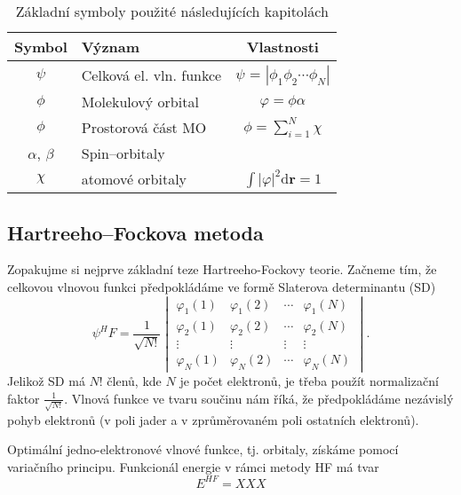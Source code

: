 \begin{table}[ht]
\centering
\caption{Základní symboly použité následujících kapitolách}
\begin{tabular}{|c|l|c|}
\hline 
\rule[-1ex]{0pt}{2.5ex} Symbol & 	Význam	& Vlastnosti \\ 
\hline 
\rule[-1ex]{0pt}{2.5ex} $\psi$ & Celková el. vln. funkce  & $\psi$ = $|\phi_1 \phi_2 \cdots \phi_N |$ \\ 
\hline 
\rule[-1ex]{0pt}{2.5ex} $\phi$ & Molekulový orbital & $\varphi=\phi \alpha $\\ 
\hline 
\rule[-1ex]{0pt}{2.5ex} $\phi$ & Prostorová část MO & $\phi=\sum_{i=1}^N \chi $ \\ 
\hline 
\rule[-1ex]{0pt}{2.5ex} $\alpha$, $\beta$  & Spin--orbitaly & \\ 
\hline 
\rule[-1ex]{0pt}{2.5ex} $\chi$ & atomové orbitaly & $\int |\varphi|^2 \mathrm{d}\textbf{r} = 1 $ \\
\hline
\end{tabular} 
\label{tab:vlnfunkce}
\end{table}

\subsection{Hartreeho--Fockova metoda}

Zopakujme si nejprve základní teze Hartreeho-Fockovy teorie. Začneme tím, že celkovou vlnovou funkci předpokládáme ve formě Slaterova determinantu (SD)
\begin{equation}
\psi^HF=\frac{1}{\sqrt{N!}}\begin{vmatrix}
\varphi_1(1) & \varphi_1(2) & \cdots & \varphi_1(N) \\
\varphi_2(1) & \varphi_2(2) & \cdots & \varphi_2(N) \\
\vdots & \vdots & \vdots & \vdots \\
\varphi_N(1) & \varphi_N (2) & \cdots & \varphi_N(N)
\end{vmatrix}.
\end{equation}
Jelikož SD má $N!$ členů, kde $N$ je počet elektronů, je třeba použít normalizační faktor $\frac{1}{\sqrt{N!}}$. Vlnová funkce ve tvaru součinu nám říká, že předpokládáme nezávislý pohyb elektronů (v poli jader a v zprůměrovaném poli ostatních elektronů).

Optimální jedno-elektronové vlnové funkce, tj. orbitaly, získáme pomocí variačního principu. Funkcionál energie v rámci metody HF má tvar 
\begin{equation}
E^{HF}=  XXX 
\end{equation}


